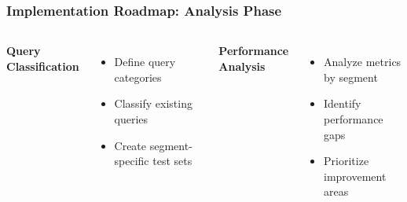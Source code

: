 \begin{frame}
    \frametitle{Implementation Roadmap: Analysis Phase}
    
    \begin{center}
    \end{center}
    
    \begin{columns}
        \textbf{Query Classification}
        \begin{itemize}
            \item Define query categories
            \item Classify existing queries
            \item Create segment-specific test sets
        \end{itemize}
        
        \textbf{Performance Analysis}
        \begin{itemize}
            \item Analyze metrics by segment
            \item Identify performance gaps
            \item Prioritize improvement areas
        \end{itemize}
    \end{columns}
\end{frame}

